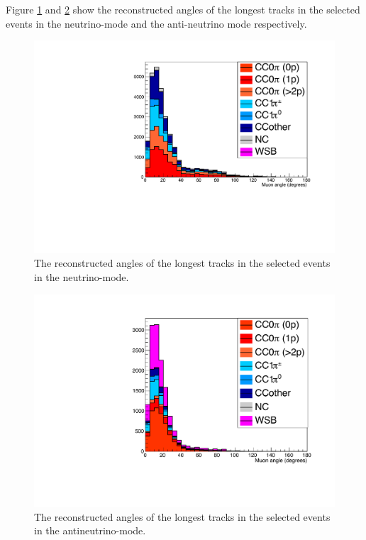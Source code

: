 
Figure \ref{fig:angle_allcut_neutrino} and \ref{fig:angle_allcut_antineutrino} show the reconstructed angles of the longest tracks in the selected events in the neutrino-mode and the anti-neutrino mode respectively.

\begin{figure}[tbh]
\begin{center}
\includegraphics[width=0.5\linewidth, angle=270]{fig/FHCMuonAngle_StoppedOrThroughGoing.pdf}
\end{center}
\caption{
The reconstructed angles of the longest tracks in the selected events in the neutrino-mode.
}
\label{fig:angle_allcut_neutrino}
\end{figure}

\begin{figure}[tbh]
\begin{center}
\includegraphics[width=0.5\linewidth, angle=270]{fig/RHCMuonAngle_StoppedOrThroughGoing.pdf}
\end{center}
\caption{
The reconstructed angles of the longest tracks in the selected events in the antineutrino-mode.
}
\label{fig:angle_allcut_antineutrino}
\end{figure}


